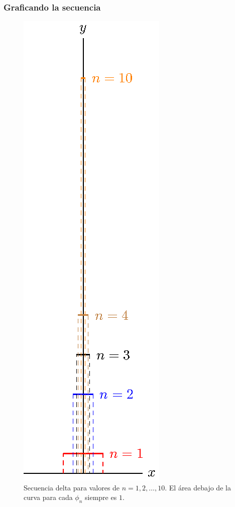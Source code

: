 \documentclass[12pt]{beamer}
\begin{document}
\begin{frame}
\frametitle{Graficando la secuencia}
\begin{figure}[H]
    \centering
    \includegraphics[scale=0.5]{Imagenes/plot_secuencia_delta.eps}
    \caption{Secuencia delta para valores de $n = 1, 2, \ldots, 10$. El área debajo de la curva para cada $\phi_{n}$ siempre es $1$.}
    \label{fig:secuncia_delta_01}
\end{figure}
\end{frame}
\end{document}
